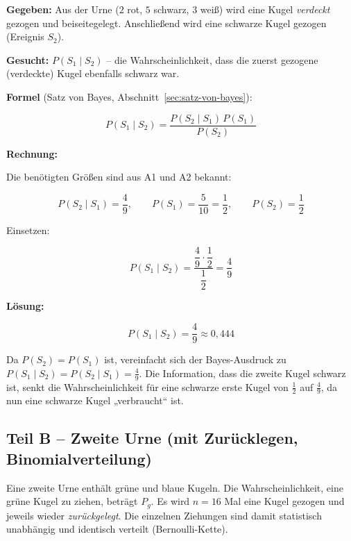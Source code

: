 \begin{beispiel}

\textbf{Gegeben:} Aus der Urne ($2$ rot, $5$ schwarz, $3$ weiß) wird eine Kugel
\emph{verdeckt} gezogen und beiseitegelegt. Anschließend wird eine schwarze
Kugel gezogen (Ereignis $S_2$).

\textbf{Gesucht:} $P(S_1 \mid S_2)$ -- die Wahrscheinlichkeit, dass die
zuerst gezogene (verdeckte) Kugel ebenfalls schwarz war.

\textbf{Formel} (Satz von Bayes, Abschnitt~\ref{sec:satz-von-bayes}):

$$
P(S_1 \mid S_2) = \frac{P(S_2 \mid S_1)\, P(S_1)}{P(S_2)}
$$

\textbf{Rechnung:}

Die benötigten Größen sind aus A1 und A2 bekannt:

$$
P(S_2 \mid S_1) = \frac{4}{9}, \qquad
P(S_1) = \frac{5}{10} = \frac{1}{2}, \qquad
P(S_2) = \frac{1}{2}
$$

Einsetzen:

$$
P(S_1 \mid S_2) = \frac{\dfrac{4}{9}\cdot\dfrac{1}{2}}{\dfrac{1}{2}}
               = \frac{4}{9}
$$

\textbf{Lösung:}

$$
\boxed{P(S_1 \mid S_2) = \frac{4}{9} \approx 0{,}444}
$$

Da $P(S_2) = P(S_1)$ ist, vereinfacht sich der Bayes-Ausdruck zu
$P(S_1 \mid S_2) = P(S_2 \mid S_1) = \tfrac{4}{9}$. Die Information, dass die
zweite Kugel schwarz ist, senkt die Wahrscheinlichkeit für eine schwarze erste
Kugel von $\tfrac{1}{2}$ auf $\tfrac{4}{9}$, da nun eine schwarze Kugel
„verbraucht`` ist.

\end{beispiel}

\subsection*{Teil B – Zweite Urne (mit Zurücklegen, Binomialverteilung)}

Eine zweite Urne enthält grüne und blaue Kugeln. Die Wahrscheinlichkeit, eine
grüne Kugel zu ziehen, beträgt $P_g$. Es wird $n = 16$ Mal eine Kugel gezogen
und jeweils wieder \emph{zurückgelegt}. Die einzelnen Ziehungen sind damit
statistisch unabhängig und identisch verteilt (Bernoulli-Kette).

